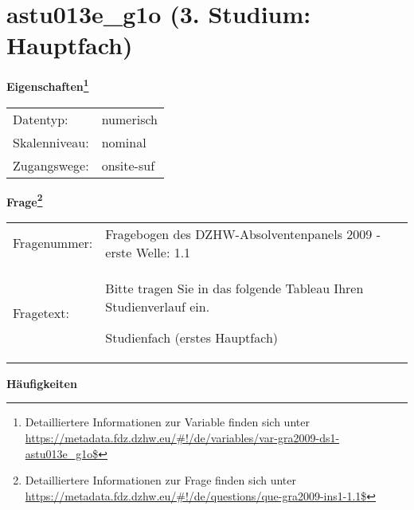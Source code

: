 
    \setcounter{footnote}{0}

    \vspace*{-1.8cm}
	\section{astu013e\_g1o (3. Studium: Hauptfach)}
	\label{section:astu013e_g1o}



    \vspace*{0.5cm}
    \noindent\textbf{Eigenschaften\footnote{Detailliertere Informationen zur Variable finden sich unter
		\url{https://metadata.fdz.dzhw.eu/\#!/de/variables/var-gra2009-ds1-astu013e_g1o$}}}\\
	\begin{tabularx}{\hsize}{@{}lX}
	Datentyp: & numerisch \\
	Skalenniveau: & nominal \\
	Zugangswege: &
	  onsite-suf
 \\
    \end{tabularx}



				\vspace*{0.5cm}
                \noindent\textbf{Frage\footnote{Detailliertere Informationen zur Frage finden sich unter
		              \url{https://metadata.fdz.dzhw.eu/\#!/de/questions/que-gra2009-ins1-1.1$}}}\\
				\begin{tabularx}{\hsize}{@{}lX}
					Fragenummer: &
					  Fragebogen des DZHW-Absolventenpanels 2009 - erste Welle:
					  1.1
 \\
					Fragetext: & Bitte tragen Sie in das folgende Tableau Ihren Studienverlauf ein.\par  Studienfach (erstes Hauptfach) \\
				\end{tabularx}





        		\vspace*{0.5cm}
                \noindent\textbf{Häufigkeiten}

